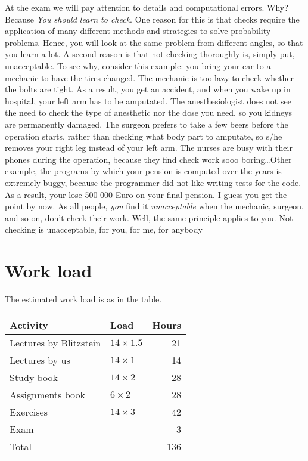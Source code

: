 \documentclass[a4paper]{article}
\theoremstyle{definition}
\newcommand{\1}[1]{\,I_{#1}} %
\begin{document}
At the exam we will pay attention to details and computational errors. Why? Because \emph{You should learn to check}.
One reason for this is that checks require the application of many different methods and strategies to solve probability problems.
Hence, you will look at the same problem from different angles, so that you learn a lot.
A second reason is that not checking thoroughly is, simply put, unacceptable. 
To see why, consider this example:  you bring your car to a mechanic to have the tires changed.
The mechanic is too lazy to check whether the bolts are tight.
As a result, you get an accident, and when you wake up in hospital, your left arm has to be amputated.
The anesthesiologist does not see the need to check the type of anesthetic nor the dose you need, so you kidneys are permanently damaged.
The surgeon prefers to take a few beers before the operation starts, rather than checking what body part to amputate, so s/he removes your right leg instead of your left arm.
The nurses are busy with their phones during the operation, because they find check work sooo boring\ldots Other example, the programs by which your pension is computed over the years is extremely buggy, because the programmer did not like writing tests for the code.
As a result, your lose 500 000 Euro on your final pension.
I guess you get the point by now.
As all people, \emph{you} find it \emph{unacceptable} when the mechanic, surgeon, and so on, don't check their work.
Well, the same principle applies to you.
Not checking is unacceptable, for you, for me, for anybody

\section{Work load}
\label{sec:orgfb1b7cf}

The estimated work load is as in the table.

\begin{center}
\begin{tabular}{llr}
Activity & Load & Hours\\
\hline
Lectures by Blitzstein & \(14\times 1.5\) & 21\\
Lectures by us & \(14\times 1\) & 14\\
Study book & \(14\times 2\) & 28\\
Assignments book & \(6\times 2\) & 28\\
Exercises & \(14\times 3\) & 42\\
Exam &  & 3\\
\hline
Total &  & 136\\
\end{tabular}
\end{center}
\end{document}
